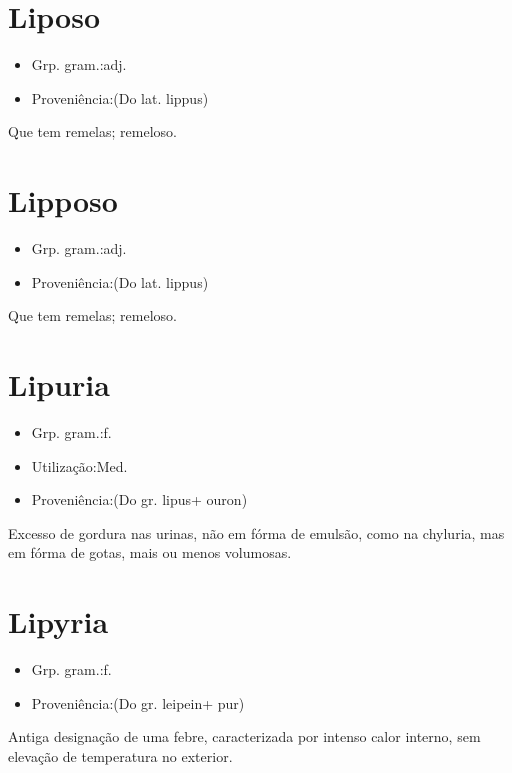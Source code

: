 \section{Liposo}
\begin{itemize}
\item {Grp. gram.:adj.}
\end{itemize}
\begin{itemize}
\item {Proveniência:(Do lat. \textunderscore lippus\textunderscore )}
\end{itemize}
Que tem remelas; remeloso.
\section{Lipposo}
\begin{itemize}
\item {Grp. gram.:adj.}
\end{itemize}
\begin{itemize}
\item {Proveniência:(Do lat. \textunderscore lippus\textunderscore )}
\end{itemize}
Que tem remelas; remeloso.
\section{Lipuria}
\begin{itemize}
\item {Grp. gram.:f.}
\end{itemize}
\begin{itemize}
\item {Utilização:Med.}
\end{itemize}
\begin{itemize}
\item {Proveniência:(Do gr. \textunderscore lipus\textunderscore  + \textunderscore ouron\textunderscore )}
\end{itemize}
Excesso de gordura nas urinas, não em fórma de emulsão, como na chyluria, mas em fórma de gotas, mais ou menos volumosas.
\section{Lipyria}
\begin{itemize}
\item {Grp. gram.:f.}
\end{itemize}
\begin{itemize}
\item {Proveniência:(Do gr. \textunderscore leipein\textunderscore  + \textunderscore pur\textunderscore )}
\end{itemize}
Antiga designação de uma febre, caracterizada por intenso calor interno, sem elevação de temperatura no exterior.
